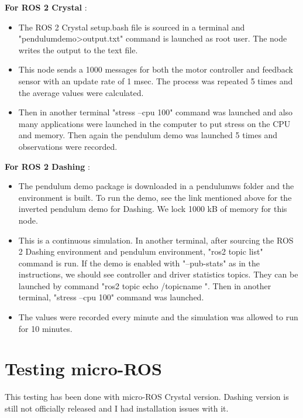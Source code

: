 \documentclass[%
xelatex,
	oneside,		%
	12pt,			%
	parskip=half,	%
	abstracton,
	chapterprefix=true%
    appendixprefix=true]
{scrbook}
\begin{document}
{\bfseries For ROS 2 Crystal} :
\begin{itemize}
\item The ROS 2 Crystal setup.bash file is sourced in a terminal and "pendulum\textunderscore demo>output.txt" command is launched as root user. The node writes the output to the text file.
\item This node sends a 1000 messages for both the motor controller and feedback sensor with an update rate of 1 msec. The process was repeated 5 times and the average values were calculated.
\item Then in another terminal "stress --cpu 100" command was launched and also many applications were launched in the computer to put stress on the CPU and memory. Then again the pendulum demo was launched 5 times and observations were recorded.
\end{itemize}
{\bfseries For ROS 2 Dashing} :
\begin{itemize}
\item The pendulum demo package is downloaded in a pendulum\textunderscore ws folder and the environment is built. To run the demo, see the link mentioned above for the inverted pendulum demo for Dashing. We lock 1000 kB of memory for this node.
\item This is a continuous simulation. In another terminal, after sourcing the ROS 2 Dashing environment and pendulum environment, "ros2 topic list" command is run. If the demo is enabled with "--pub-stats" as in the instructions, we should see controller and driver statistics topics. They can be launched by command "ros2 topic echo /topic\textunderscore name ". Then in another terminal, "stress --cpu 100" command was launched.
\item The values were recorded every minute and the simulation was allowed to run for 10 minutes.
\end{itemize}
\section{Testing micro-ROS}
\vspace*{0.5cm}
This testing has been done with micro-ROS Crystal version. Dashing version is still not officially released and I had installation issues with it.
\end{document}
